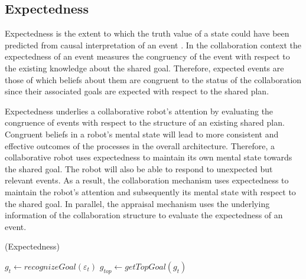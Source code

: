 \documentclass{aamas2016}
\begin{document}
\subsection{Expectedness}

Expectedness is the extent to which the truth value of a state could have been
predicted from causal interpretation of an event
\cite{marsella:ema-process-model}. In the collaboration context the expectedness
of an event measures the congruency of the event with respect to the existing
knowledge about the shared goal. Therefore, expected events are those of which
beliefs about them are congruent to the status of the collaboration since their
associated goals are expected with respect to the shared plan.

Expectedness underlies a collaborative robot's attention by evaluating the
congruence of events with respect to the structure of an existing shared plan.
Congruent beliefs in a robot's mental state will lead to more consistent and
effective outcomes of the processes in the overall architecture. Therefore,
a collaborative robot uses expectedness to maintain its own mental state towards
the shared goal. The robot will also be able to respond to unexpected but
relevant events. As a result, the collaboration mechanism uses expectedness to
maintain the robot's attention and subsequently its mental state with respect to
the shared goal. In parallel, the appraisal mechanism uses the underlying
information of the collaboration structure to evaluate the expectedness of an
event.

\begin{algorithm}
	\caption{(Expectedness)}
	\label{alg:expectedness}
	\begin{algorithmic}[1]
			\Statex
			\State $\mathit{g}_{t} \gets \textit{recognizeGoal}{(\varepsilon_t)}$
			\State $\mathit{g}_{top} \gets \textit{getTopGoal}{(\mathit{g}_{t})}$
			\Statex
					\State {}
				\Else
					\State {}
				\EndIf
			\Else
					\State {}
				\Else
					\State {}
				\EndIf
			\EndIf
		\EndFunction
	\end{algorithmic}
\end{algorithm}
\end{document}
